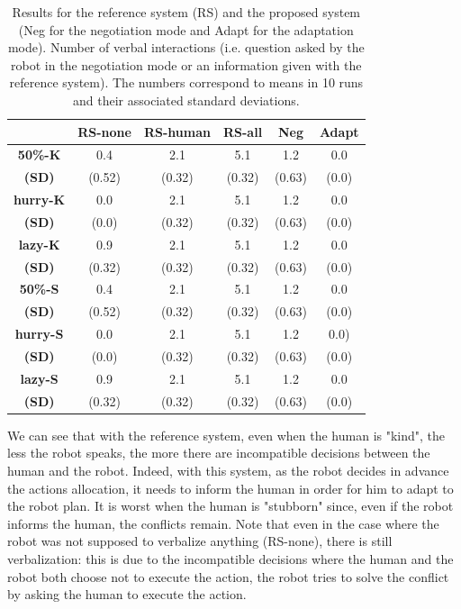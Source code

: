 \documentclass[english,a4paper,11pt,twoside]{StyleThese}
\begin{document}
\begin{table}[!h]
  \begin{tabular}{|c||c|c|c|c|c||}
  \hline
     & \textbf{RS-none} & \textbf{RS-human} & \textbf{RS-all} & \textbf{Neg} & \textbf{Adapt} \\
  \hline
  \hline
     \textbf{50\%-K} & 0.4 & 2.1 & 5.1 & 1.2 & 0.0 \\
     \textbf{(SD)} & (0.52) & (0.32) & (0.32) & (0.63) & (0.0) \\
  \hline
     \textbf{hurry-K} & 0.0 & 2.1 & 5.1 & 1.2 & 0.0 \\
     \textbf{(SD)} & (0.0) & (0.32) & (0.32) & (0.63) & (0.0) \\
  \hline
     \textbf{lazy-K} & 0.9 & 2.1 & 5.1 & 1.2 & 0.0 \\
     \textbf{(SD)} & (0.32) & (0.32) & (0.32) & (0.63) & (0.0) \\
  \hline
     \textbf{50\%-S} & 0.4 & 2.1 & 5.1 & 1.2 & 0.0 \\
     \textbf{(SD)} & (0.52) & (0.32) & (0.32) & (0.63) & (0.0) \\
  \hline
     \textbf{hurry-S} & 0.0 & 2.1 & 5.1 & 1.2 & 0.0) \\
     \textbf{(SD)} & (0.0) & (0.32) & (0.32) & (0.63) & (0.0) \\
  \hline
     \textbf{lazy-S} & 0.9 & 2.1 & 5.1 & 1.2 & 0.0 \\
     \textbf{(SD)} & (0.32) & (0.32) & (0.32) & (0.63) & (0.0) \\
  \hline
  \end{tabular}
   \caption{Results for the reference system (RS) and the proposed system (Neg for the negotiation mode and Adapt for the adaptation mode). Number of verbal interactions (i.e. question asked by the robot in the negotiation mode or an information given with the reference system). The numbers correspond to means in 10 runs and their associated standard deviations.}
   \label{tab:verb}
\end{table}

We can see that with the reference system, even when the human is "kind", the less the robot speaks, the more there are incompatible decisions between the human and the robot. Indeed, with this system, as the robot decides in advance the actions allocation, it needs to inform the human in order for him to adapt to the robot plan. It is worst when the human is "stubborn" since, even if the robot informs the human, the conflicts remain. Note that even in the case where the robot was not supposed to verbalize anything (RS-none), there is still verbalization: this is due to the incompatible decisions where the human and the robot both choose not to execute the action, the robot tries to solve the conflict by asking the human to execute the action.
\end{document}
